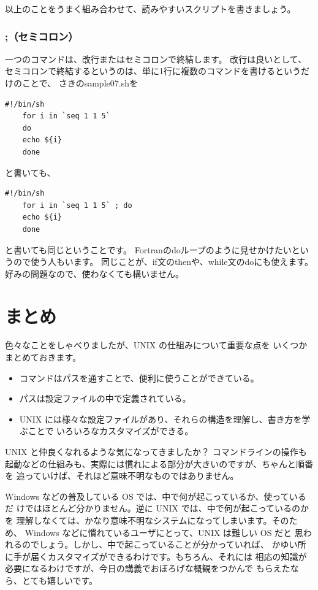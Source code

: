 \documentclass[a4j]{ltjsreport}
\begin{document}
    以上のことをうまく組み合わせて、読みやすいスクリプトを書きましょう。

    \subsection{;（セミコロン）}
    一つのコマンドは、改行またはセミコロンで終結します。
    改行は良いとして、セミコロンで終結するというのは、単に1行に複数のコマンドを書けるというだけのことで、
    さきのsample07.shを
    \begin{lstlisting}[caption=sample07.sh 改6]
    #!/bin/sh
    for i in `seq 1 1 5`
    do
    echo ${i}
    done
    \end{lstlisting}
    と書いても、
    \begin{lstlisting}[caption=sample07.sh 改7]
    #!/bin/sh
    for i in `seq 1 1 5` ; do
    echo ${i}
    done
    \end{lstlisting}
    と書いても同じということです。
    Fortranのdoループのように見せかけたいというので使う人もいます。
    同じことが、if文のthenや、while文のdoにも使えます。
    好みの問題なので、使わなくても構いません。


    \chapter{まとめ}
    色々なことをしゃべりましたが、UNIX の仕組みについて重要な点を
    いくつかまとめておきます。
    \begin{itemize}
        \item コマンドはパスを通すことで、便利に使うことができている。
        \item パスは設定ファイルの中で定義されている。
        \item UNIX には様々な設定ファイルがあり、それらの構造を理解し、書き方を学ぶことで
            いろいろなカスタマイズができる。
    \end{itemize}

    UNIX と仲良くなれるような気になってきましたか？ コマンドラインの操作も
    起動などの仕組みも、実際には慣れによる部分が大きいのですが、ちゃんと順番を
    追っていけば、それほど意味不明なものではありません。

    Windows などの普及している OS では、中で何が起こっているか、使っているだ
    けではほとんど分かりません。逆に UNIX では、中で何が起こっているのかを
    理解しなくては、かなり意味不明なシステムになってしまいます。そのため、
    Windows などに慣れているユーザにとって、UNIX は難しい OS だと
    思われるのでしょう。しかし、中で起こっていることが分かっていれば、
    かゆい所に手が届くカスタマイズができるわけです。もちろん、それには
    相応の知識が必要になるわけですが、今日の講義でおぼろげな概観をつかんで
    もらえたなら、とても嬉しいです。
\end{document}
